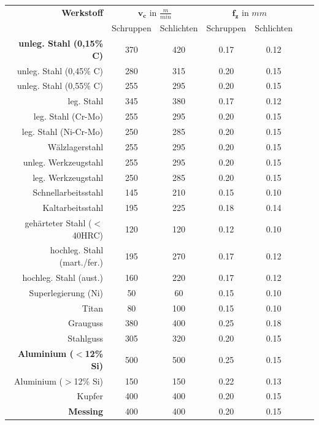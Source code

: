 \documentclass{\basedir/fablab-document}
\newcommand{\mcc}[1]{\multicolumn{2}{c}{#1}}
\begin{document}
\begin{table}
\centering
\setlength{\tabcolsep}{0.5em}
\begin{tabular}{rcccccc}
  \textbf{Werkstoff}  & \mcc{$\mathbf{v_c} \textrm{ in } \frac{m}{min} $} & \mcc{$\mathbf{f_z} \textrm{ in } mm$} &\\
  \addlinespace \toprule
								   & Schruppen 	& Schlichten 	& Schruppen 	& Schlichten		\\ \toprule
  \textbf{unleg. Stahl (0,15\% C)} & 370 	& 420  	& 0.17 	& 0.12\\
  unleg. Stahl (0,45\% C)	       & 280 	& 315  	& 0.20 	& 0.15\\
  unleg. Stahl (0,55\% C)		   & 255 	& 295  	& 0.20 	& 0.15\\
	leg. Stahl					   & 345 	& 380  	& 0.17 	& 0.12\\
	leg. Stahl (Cr-Mo)			   & 255 	& 295  	& 0.20 	& 0.15\\	
	leg. Stahl (Ni-Cr-Mo)		   & 250 	& 285  	& 0.20 	& 0.15\\
	Wälzlagerstahl				   & 255 	& 295  	& 0.20 	& 0.15\\
	unleg. Werkzeugstahl		   & 255 	& 295  	& 0.20 	& 0.15\\	
	leg. Werkzeugstahl			   & 250 	& 285  	& 0.20 	& 0.15\\	
	Schnellarbeitsstahl			   & 145 	& 210  	& 0.15 	& 0.10\\	
	Kaltarbeitsstahl			   & 195 	& 225  	& 0.18 	& 0.14\\	
	gehärteter Stahl ($<$40HRC)	   & 120 	& 120  	& 0.12 	& 0.10\\	
	hochleg. Stahl	(mart./fer.)   & 195 	& 270  	& 0.17 	& 0.12\\
	hochleg. Stahl	(aust.)		   & 160 	& 220  	& 0.17 	& 0.12\\
	Superlegierung (Ni)			   & 50	 	& 60  	& 0.15 	& 0.10\\
	Titan						   & 80	 	& 100  	& 0.15 	& 0.10\\
	Grauguss					   & 380	& 400  	& 0.25 	& 0.18\\
	Stahlguss					   & 305	& 320  	& 0.20 	& 0.15\\
	\textbf{Aluminium ($<$12\% Si)}	   & 500	& 500  	& 0.25 	& 0.15\\
	Aluminium ($>$12\% Si)	       & 150	& 150  	& 0.22 	& 0.13\\
	Kupfer						   & 400	& 400  	& 0.20 	& 0.15\\
	\textbf{Messing}			   & 400	& 400  	& 0.20 	& 0.15\\

\end{tabular}
\end{table}
\end{document}
